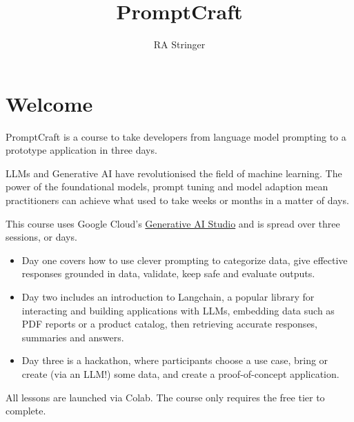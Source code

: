 \documentclass[
  letterpaper,
  DIV=11,
  numbers=noendperiod]{scrreprt}
\title{PromptCraft}
\author{RA Stringer}
\date{}
\renewcommand*\contentsname{Table of contents}
\newcommand\contentsname{Table of contents}
\begin{document}
\maketitle
\ifdefined\Shaded\renewenvironment{Shaded}{\begin{tcolorbox}[interior hidden, frame hidden, sharp corners, enhanced, breakable, boxrule=0pt, borderline west={3pt}{0pt}{shadecolor}]}{\end{tcolorbox}}\fi

\renewcommand*\contentsname{Table of contents}
{
\hypersetup{linkcolor=}
\setcounter{tocdepth}{2}
\tableofcontents
}

\hypertarget{welcome}{%
\chapter*{Welcome}\label{welcome}}


PromptCraft is a course to take developers from language model prompting
to a prototype application in three days.

LLMs and Generative AI have revolutionised the field of machine
learning. The power of the foundational models, prompt tuning and model
adaption mean practitioners can achieve what used to take weeks or
months in a matter of days.

This course uses Google Cloud's
\href{https://cloud.google.com/ai/generative-ai}{Generative AI Studio}
and is spread over three sessions, or days.

\begin{itemize}
\item
  Day one covers how to use clever prompting to categorize data, give
  effective responses grounded in data, validate, keep safe and evaluate
  outputs.
\item
  Day two includes an introduction to Langchain, a popular library for
  interacting and building applications with LLMs, embedding data such
  as PDF reports or a product catalog, then retrieving accurate
  responses, summaries and answers.
\item
  Day three is a hackathon, where participants choose a use case, bring
  or create (via an LLM!) some data, and create a proof-of-concept
  application.
\end{itemize}

All lessons are launched via Colab. The course only requires the free
tier to complete.
\end{document}
